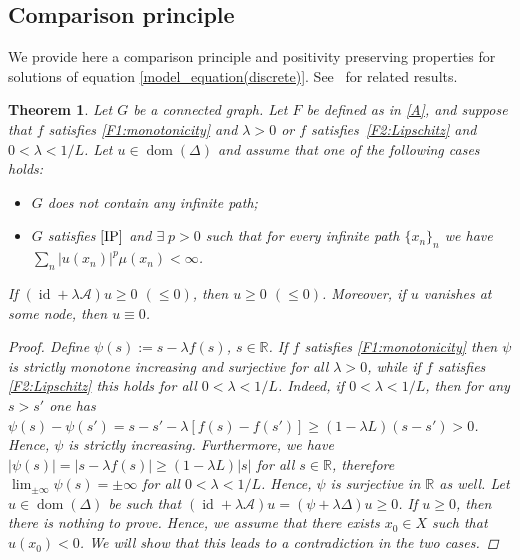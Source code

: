 \documentclass[journal]{article}
\newtheorem{theorem}{Theorem}[section]
\theoremstyle{nonitalic}
\theoremstyle{nonitalic}
\theoremstyle{plain} %
\numberwithin{equation}{section}
\newcommand{\R}{\mathbb{R}}
\newcommand{\dom}{\operatorname{dom}}
\begin{document}
\subsection{Comparison principle}\label{comparison}
We provide here a  comparison principle and positivity preserving properties for solutions of equation \eqref{model_equation(discrete)}.   See~\cite{bianchi2022generalized,bksw} for related results.
 


\begin{theorem}\label{thm:min_principle}
Let $G$ be a connected graph. Let $F$ be defined as in \eqref{A}, and suppose that $f$ satisfies \textnormal{\ref{F1:monotonicity}} and $\lambda>0$ or $f$ satisfies~\textnormal{\ref{F2:Lipschitz}} and $0<\lambda<1/L$. Let $u \in \dom\left(\Delta\right)$ and assume that one of the following cases holds:



\begin{itemize}
\item[\textbf{a)}] $G$ does not contain any infinite path;
\item[\textbf{b)}] $G$ satisfies $\textnormal{\ref{IP}}$ and $\exists\; p> 0$ such that for every infinite path $\{x_n\}_n$ we have  $\sum_{n}|u(x_{n})|^p\mu(x_{n})<\infty$. 
\end{itemize}

If $\left( {\operatorname{id}}+\lambda \mathcal A\right)u \geq 0$ $(\leq 0)$, then $u \geq 0$ $(\leq 0)$. Moreover, if $u$ vanishes at some node, then $u\equiv 0$. 



\begin{proof}
Define $\psi(s):=s-\lambda f(s)$, $s\in\R$. If $f$ satisfies \textnormal{\ref{F1:monotonicity}} then $\psi$ is strictly monotone increasing and surjective for all $\lambda >0$,  while if $f$ satisfies \textnormal{\ref{F2:Lipschitz}} this holds for all $0<\lambda <1/L$. Indeed, if $0<\lambda <1/L$, then for any $s>s'$ one has $\psi(s)- \psi(s')= s-s' - \lambda [f(s)-f(s')]\geq (1-\lambda L)(s-s')>0$. Hence, $\psi$ is strictly increasing.  Furthermore, we have $|\psi(s)|=|s -\lambda f(s)|\geq (1-\lambda L)|s|$ for all $s\in \R$, therefore $\lim_{\pm \infty} \psi(s)=\pm \infty$ for all $0<\lambda <1/L$. Hence, $\psi$ is surjective in $\R$ as well. Let $u \in \dom\left(\Delta\right)$ be such that $\left( {\operatorname{id}}+\lambda \mathcal A\right)u=\left( \psi + \lambda\Delta\right)u \geq 0$. If $u\geq0$, then there is nothing to prove.
Hence, we assume that there exists $x_{0}\in X$ such that $u(x_{0}) <0$. We will show that this leads to a contradiction in the two cases.


\end{proof}
\end{theorem}
\end{document}
